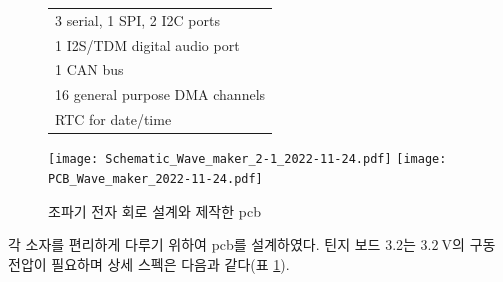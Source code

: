 \begin{figure}[H]
\begin{minipage}[b]{.5\linewidth}
{\begin{tabular}{l}
            3 serial, 1 SPI, 2 I2C ports\\
            1 I2S/TDM digital audio port\\
            1 CAN bus\\
            16 general purpose DMA channels\\
            RTC for date/time\\
            \hline
        \end{tabular}
    }
    \label{Specification of Teensy Board}
  \end{minipage}
\end{figure}

\begin{figure}[H]
	\begin{center}
		\texttt{[image: Schematic\_Wave\_maker\_2-1\_2022-11-24.pdf]}
		\texttt{[image: PCB\_Wave\_maker\_2022-11-24.pdf]}
        \caption{조파기 전자 회로 설계와 제작한 pcb}
		\label{PCB}
	\end{center}
\end{figure}


각 소자를 편리하게 다루기 위하여 pcb를 설계하였다. 틴지 보드 3.2는 $3.2~\mathrm{V}$의 구동 전압이 필요하며 상세 스펙은 다음과 같다(표 \ref{Specification of Teensy Board}).

